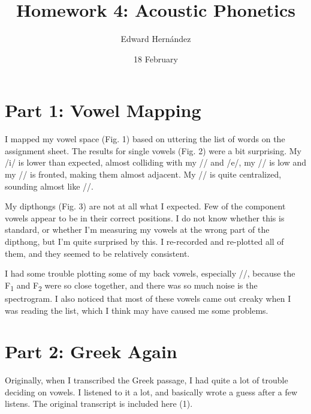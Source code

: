 \documentclass[doc,12pt]{apa6}
\begin{document}
\title{Homework 4: Acoustic Phonetics}
\author{Edward Hern\'{a}ndez}
\date{18 February}
\maketitle

\section{Part 1: Vowel Mapping}

I mapped my vowel space (Fig. 1) based on uttering the list of words on the
assignment sheet. The results for single vowels (Fig. 2) were a bit surprising.
My /i/ is lower than expected, almost colliding with my // and /e/,
my // is low and my // is fronted, making them almost
adjacent.  My // is quite centralized, sounding almost like
//.

My dipthongs (Fig. 3) are not at all what I expected. Few of the component
vowels appear to be in their correct positions. I do not know whether this is
standard, or whether I'm measuring my vowels at the wrong part of the dipthong,
but I'm quite surprised by this. I re-recorded and re-plotted all of them, and
they seemed to be relatively consistent.

I had some trouble plotting some of my back vowels, especially //,
because the F\textsubscript{1} and F\textsubscript{2} were so close together,
and there was so much noise is the spectrogram. I also noticed that most of
these vowels came out creaky when I was reading the list, which I think may
have caused me some problems.

\section{Part 2: Greek Again}

Originally, when I transcribed the Greek passage, I had quite a lot of trouble
deciding on vowels. I listened to it a lot, and basically wrote a guess after a
few listens. The original transcript is included here (1).

\begin{exe}
	\ex {}
\end{exe}
\end{document}
